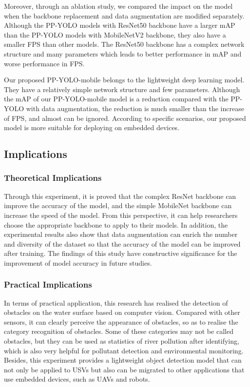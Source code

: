 \documentclass[sensors,article,submit,moreauthors,pdftex]{Definitions/mdpi}
\begin{document}
Moreover, through an ablation study, we compared the impact on the model when the backbone replacement and data augmentation are modified separately.
Although the PP-YOLO models with ResNet50 backbone have a larger mAP than the PP-YOLO models with MobileNetV2 backbone, they also have a smaller FPS than other models. The ResNet50 backbone has a complex network structure and many parameters which leads to better performance in mAP and worse performance in FPS.


Our proposed PP-YOLO-mobile belongs to the lightweight deep learning model. They have a relatively simple network structure and few parameters. Although the mAP of our PP-YOLO-mobile model is a reduction compared with the PP-YOLO with data augmentation, the reduction is much smaller than the increase of FPS, and almost can be ignored. According to specific scenarios, our proposed model is more suitable for deploying on embedded devices.


\subsection{Implications}
\subsubsection{Theoretical Implications}
Through this experiment, it is proved that the complex ResNet backbone can improve the accuracy of the model, and the simple MobileNet backbone can increase the speed of the model. From this perspective, it can help researchers choose the appropriate backbone to apply to their models. In addition, the experimental results also show that data augmentation can enrich the number and diversity of the dataset so that the accuracy of the model can be improved after training. The findings of this study have constructive significance for the improvement of model accuracy in future studies.

\subsubsection{Practical Implications}
In terms of practical application, this research has realised the detection of obstacles on the water surface based on computer vision. Compared with other sensors, it can clearly perceive the appearance of obstacles, so as to realise the category recognition of obstacles.
Some of these categories may not be called obstacles, but they can be used as statistics of river pollution after identifying, which is also very helpful for pollutant detection and environmental monitoring. 
Besides, this experiment provides a lightweight object detection model that can not only be applied to USVs but also can be migrated to other applications that use embedded devices, such as UAVs and robots.
\end{document}
